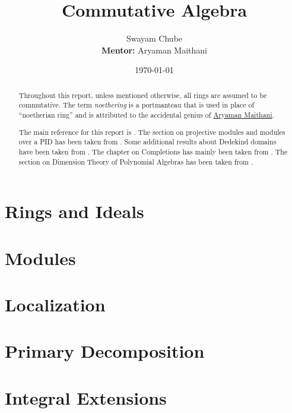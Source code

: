 \documentclass[oneside]{report}
\title{Commutative Algebra}
\author{Swayam Chube\\\textbf{Mentor:} Aryaman Maithani}
\date{\today}
\begin{document}
\maketitle

\begin{abstract}
    Throughout this report, unless mentioned otherwise, all rings are assumed to be commutative. The term \textit{noethering} is a portmanteau that is used in place of ``noetherian ring'' and is attributed to the accidental genius of \href{https://www.youtube.com/live/RrjJfyEF7Ak?feature=share&t=102}{Aryaman Maithani}.

    The main reference for this report is \cite{AM69}. The section on projective modules and modules over a PID has been taken from \cite{Lan02}. Some additional results about Dedekind domains have been taken from \cite{milne-algnt}. The chapter on Completions has mainly been taken from \cite{gopalakrishnan-ca}. The section on Dimension Theory of Polynomial Algebras has been taken from \cite{serre-local-algebra}.
\end{abstract}

\tableofcontents

\chapter{Rings and Ideals}


\chapter{Modules}


\chapter{Localization}


\chapter{Primary Decomposition}


\chapter{Integral Extensions}

\end{document}
